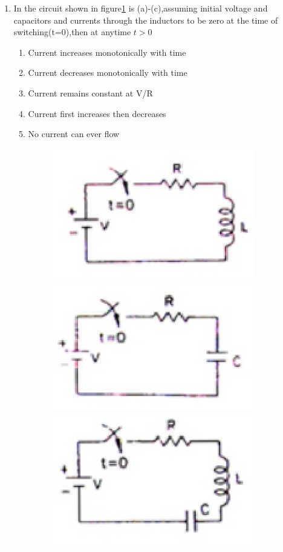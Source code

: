 \documentclass[journal,12pt,twocolumn]{IEEEtran}
\begin{document}
\begin{enumerate}
\item In the circuit shown in figure\ref{fig10} is (a)-(c),assuming initial voltage and capacitors and currents through the inductors to be zero at the time of switching(t=0),then at anytime $t>0$
\begin{enumerate}
\setlength\itemsep{2em}
\item Current increases monotonically with time
\item Current decreases monotonically with time
\item Current remains constant at V/R
\item Current first increases then decreases
\item No current can ever flow
\begin{figure}[!h]
\begin{center}
\includegraphics[scale={0.7}]{./figs/fig10a.eps}
\includegraphics[scale={0.7}]{./figs/fig10b.eps}
\includegraphics[scale={0.7}]{./figs/fig10c.eps}
\caption{}
\label{fig10}
\end{center}
\end{figure}
\end{enumerate}


\end{enumerate}
\end{document}
